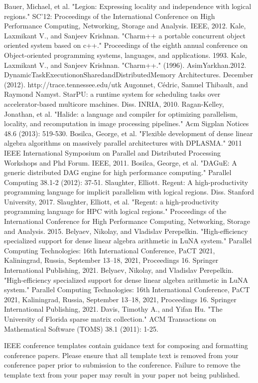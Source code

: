 \documentclass[conference]{IEEEtran}
\begin{document}
\begin{thebibliography}{00}
 Bauer, Michael, et al. "Legion: Expressing locality and independence with logical regions." SC'12: Proceedings of the International Conference on High Performance Computing, Networking, Storage and Analysis. IEEE, 2012.
 Kale, Laxmikant V., and Sanjeev Krishnan. "Charm++ a portable concurrent object oriented system based on c++." Proceedings of the eighth annual conference on Object-oriented programming systems, languages, and applications. 1993.
 Kale, Laxmikant V., and Sanjeev Krishnan. "Charm++." (1996).
 AsimYarkhan.2012. DynamicTaskExecutiononSharedandDistributedMemory Architectures. December (2012). http://trace.tennessee.edu/utk
 Augonnet, Cédric, Samuel Thibault, and Raymond Namyst. StarPU: a runtime system for scheduling tasks over accelerator-based multicore machines. Diss. INRIA, 2010.
 Ragan-Kelley, Jonathan, et al. "Halide: a language and compiler for optimizing parallelism, locality, and recomputation in image processing pipelines." Acm Sigplan Notices 48.6 (2013): 519-530.
 Bosilca, George, et al. "Flexible development of dense linear algebra algorithms on massively parallel architectures with DPLASMA." 2011 IEEE International Symposium on Parallel and Distributed Processing Workshops and Phd Forum. IEEE, 2011.
 Bosilca, George, et al. "DAGuE: A generic distributed DAG engine for high performance computing." Parallel Computing 38.1-2 (2012): 37-51.
 Slaughter, Elliott. Regent: A high-productivity programming language for implicit parallelism with logical regions. Diss. Stanford University, 2017.
 Slaughter, Elliott, et al. "Regent: a high-productivity programming language for HPC with logical regions." Proceedings of the International Conference for High Performance Computing, Networking, Storage and Analysis. 2015.
 Belyaev, Nikolay, and Vladislav Perepelkin. "High-efficiency specialized support for dense linear algebra arithmetic in LuNA system." Parallel Computing Technologies: 16th International Conference, PaCT 2021, Kaliningrad, Russia, September 13–18, 2021, Proceedings 16. Springer International Publishing, 2021.
 Belyaev, Nikolay, and Vladislav Perepelkin. "High-efficiency specialized support for dense linear algebra arithmetic in LuNA system." Parallel Computing Technologies: 16th International Conference, PaCT 2021, Kaliningrad, Russia, September 13–18, 2021, Proceedings 16. Springer International Publishing, 2021.
 Davis, Timothy A., and Yifan Hu. "The University of Florida sparse matrix collection." ACM Transactions on Mathematical Software (TOMS) 38.1 (2011): 1-25.
\end{thebibliography}

\vspace{12pt}
\color{red}
IEEE conference templates contain guidance text for composing and formatting conference papers. Please ensure that all template text is removed from your conference paper prior to submission to the conference. Failure to remove the template text from your paper may result in your paper not being published.
\end{document}
